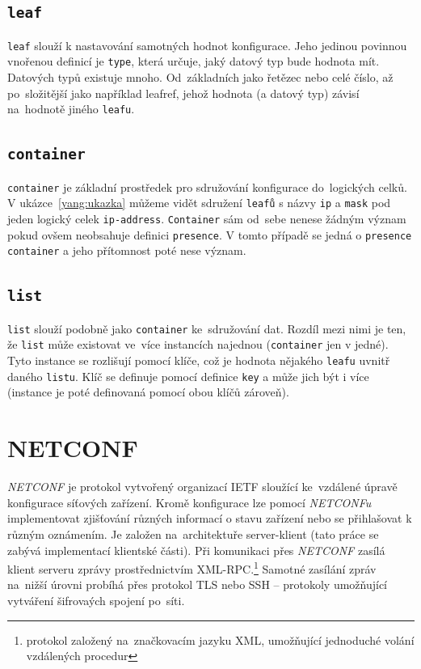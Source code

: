 \documentclass[thesis=B,czech,hidelinks]{FITthesis}[2019/03/06]
\begin{document}
\subsection{\texttt{leaf}}
\texttt{leaf} slouží k nastavování samotných hodnot konfigurace. Jeho jedinou povinnou vnořenou definicí je \texttt{type}, která určuje, jaký datový typ bude hodnota mít. Datových typů existuje mnoho. Od~základních jako řetězec nebo celé číslo, až po~složitější jako například leafref, jehož hodnota (a datový typ) závisí na~hodnotě jiného \texttt{leafu}.
\subsection{\texttt{container}}
\texttt{container} je základní prostředek pro sdružování konfigurace do~logických celků. V ukázce~\ref{yang:ukazka} můžeme vidět sdružení \texttt{leafů} s názvy \texttt{ip} a \texttt{mask} pod jeden logický celek \texttt{ip-address}. \texttt{Container} sám od~sebe nenese žádným význam pokud ovšem neobsahuje definici \texttt{presence}. V tomto případě se jedná o \texttt{presence container} a jeho přítomnost poté nese význam.
\subsection{\texttt{list}}
\texttt{list} slouží podobně jako \texttt{container} ke~sdružování dat. Rozdíl mezi nimi je ten, že \texttt{list} může existovat ve~více instancích najednou (\texttt{container} jen v jedné). Tyto instance se rozlišují pomocí klíče, což je hodnota nějakého \texttt{leafu} uvnitř daného \texttt{listu}. Klíč se definuje pomocí definice \texttt{key} a může jich být i více (instance je poté definovaná pomocí obou klíčů zároveň).


\section{NETCONF}
\textit{NETCONF} je protokol vytvořený organizací IETF sloužící ke~vzdálené úpravě konfigurace síťových zařízení. Kromě konfigurace lze pomocí \textit{NETCONFu} implementovat zjišťování různých informací o stavu zařízení nebo se přihlašovat k různým oznámením. Je založen na~architektuře server-klient (tato práce se zabývá implementací klientské části). Při komunikaci přes \textit{NETCONF} zasílá klient serveru zprávy prostřednictvím XML-RPC.\footnote{protokol založený na~značkovacím jazyku XML, umožňující jednoduché volání vzdálených procedur} Samotné zasílání zpráv na~nižší úrovni probíhá přes protokol TLS nebo SSH -- protokoly umožňující vytváření šifrovaých spojení po~síti.
\end{document}
